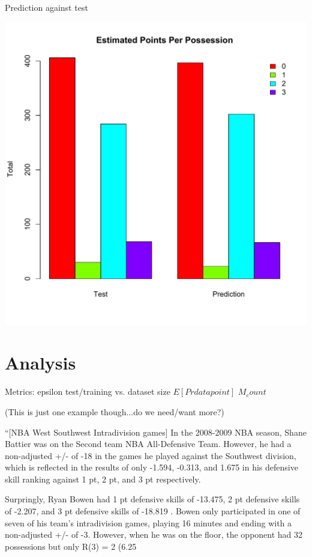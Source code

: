 \documentclass[10pt,twocolumn]{article}
\newcommand{\Elin}[1]{\ensuremath{     \mathrm{E}\left[ #1 \right]   }}
\begin{document}
Prediction against test
\begin{center}
	\includegraphics[width=0.99\linewidth]{figures/Rplot}
\end{center}



\section{Analysis}

Metrics:
epsilon
test/training vs. dataset size
$E[Pr{datapoint}]$
$M_count$

(This is just one example though...do we need/want more?)

``[NBA West Southwest Intradivision games] In the 2008-2009 NBA season, Shane Battier was on the Second team NBA All-Defensive Team. However, he had a non-adjusted +/- of -18 in the games he played against the Southwest division, which is reflected in the results of only -1.594, -0.313, and 1.675 in his defensive skill ranking against 1 pt, 2 pt, and 3 pt respectively. 

Surpringly, Ryan Bowen had 1 pt defensive skills of -13.475, 2 pt defensive skills of -2.207, and 3 pt defensive skills of -18.819 . Bowen only participated in one of seven of his team's intradivision games, playing 16 minutes and ending with a non-adjusted +/- of -3. However, when he was on the floor, the opponent had 32 possessions but only R(3) = 2 (6.25%
\end{document}
